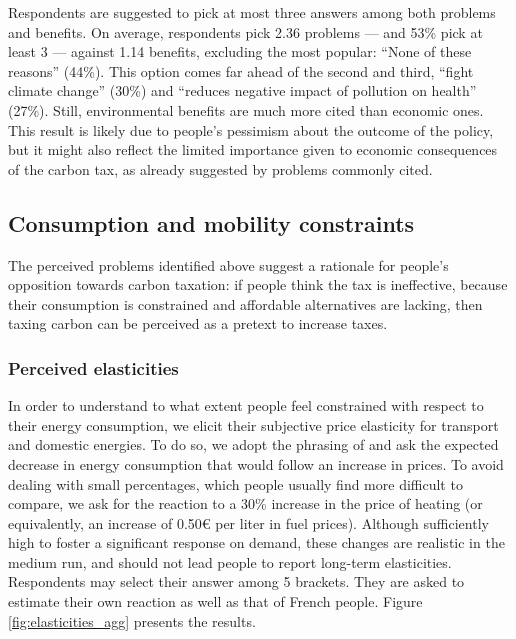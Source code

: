 \documentclass[english,5p,authoryear]{elsarticle}
\begin{document}
Respondents are suggested to pick at most three answers among both problems and benefits. On average, respondents pick 2.36 problems --- and 53\% pick at least 3 --- against 1.14 benefits, excluding the most popular: ``None of these reasons'' (44\%). This option comes far ahead of the second and third, ``fight climate change'' (30\%) and ``reduces negative impact of pollution on health'' (27\%). Still, environmental benefits are much more cited than economic ones. This result is likely due to people's pessimism about the outcome of the policy, but it might also reflect the limited importance given to economic consequences of the carbon tax, as already suggested by problems commonly cited. %

    \subsection{Consumption and mobility constraints}

The perceived problems identified above suggest a rationale for people's opposition towards carbon taxation: if people think the tax is ineffective, because their consumption is constrained and affordable alternatives are lacking, then taxing carbon can be perceived as a pretext to increase taxes. %

    \subsubsection{Perceived elasticities}

In order to understand to what extent people feel constrained with respect to their energy consumption, we elicit their subjective price elasticity for transport and domestic energies. To do so, we adopt the phrasing of \citet{baranzini_effectiveness_2017} and ask the expected decrease in energy consumption that would follow an increase in prices. To avoid dealing with small percentages, which people usually find more difficult to compare, we ask for the reaction to a 30\% increase in the price of heating (or equivalently, an increase of 0.50\euro{} per liter in fuel prices). Although sufficiently high to foster a significant response on demand, these changes are realistic in the medium run, and should not lead people to report long-term elasticities. Respondents may select their answer among 5 brackets. They are asked to estimate their own reaction as well as that of French people. Figure \ref{fig:elasticities_agg} presents the results.
\end{document}
